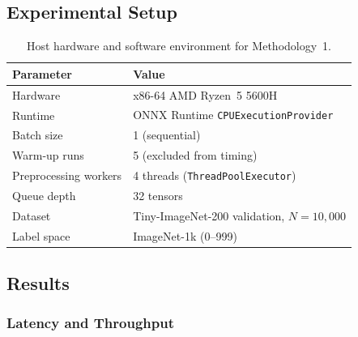 \subsection{Experimental Setup}

\begin{table}[H]
\centering
\caption{Host hardware and software environment for Methodology~1.}
\label{tab:m1_env}
\begin{tabular}{ll}
\toprule
\textbf{Parameter} & \textbf{Value} \\
\midrule
Hardware             & x86-64 AMD Ryzen~5 5600H \\
Runtime              & ONNX Runtime \texttt{CPUExecutionProvider} \\
Batch size           & 1 (sequential) \\
Warm-up runs         & 5 (excluded from timing) \\
Preprocessing workers& 4 threads (\texttt{ThreadPoolExecutor}) \\
Queue depth          & 32 tensors \\
Dataset              & Tiny-ImageNet-200 validation, $N=10{,}000$ \\
Label space          & ImageNet-1k (0--999) \\
\bottomrule
\end{tabular}
\end{table}

\subsection{Results}

\subsubsection{Latency and Throughput}

\begin{table}[H]
\centering
\caption{Latency and throughput results --- x86 CPU baseline.}
\label{tab:m1_results_lat}
\end{table}

